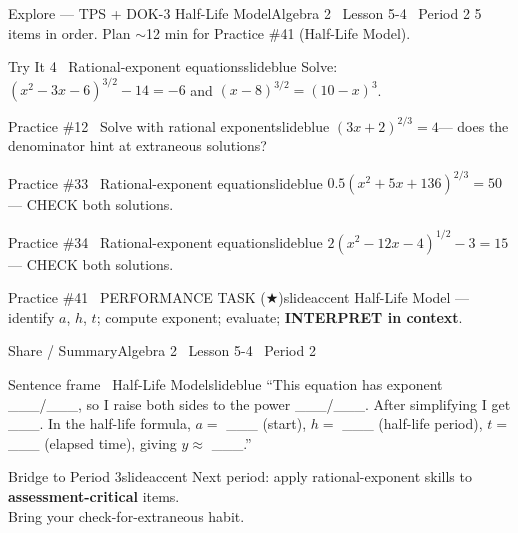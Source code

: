 \documentclass[aspectratio=169, 11pt]{beamer}
\begin{document}
\begin{frame}{Explore --- TPS + DOK-3 Half-Life Model}{Algebra 2 \textperiodcentered\ Lesson 5-4 \textperiodcentered\ Period 2}
\small\textcolor{slidegray}{5 items in order. Plan \(\sim\)12 min for Practice \#41 (Half-Life Model).}

\vspace{0.15cm}
\begin{projcard}{Try It 4 \textperiodcentered\ Rational-exponent equations}{slideblue}
Solve: \((x^2-3x-6)^{3/2} - 14 = -6\) and \((x-8)^{3/2} = (10-x)^3\).
\end{projcard}
\vspace{-0.15cm}
\begin{projcard}{Practice \#12 \textperiodcentered\ Solve with rational exponent}{slideblue}
\((3x + 2)^{2/3} = 4\)\quad --- does the denominator hint at extraneous solutions?
\end{projcard}
\vspace{-0.15cm}
\begin{projcard}{Practice \#33 \textperiodcentered\ Rational-exponent equation}{slideblue}
\(0.5(x^2+5x+136)^{2/3} = 50\)\quad --- CHECK both solutions.
\end{projcard}
\vspace{-0.15cm}
\begin{projcard}{Practice \#34 \textperiodcentered\ Rational-exponent equation}{slideblue}
\(2(x^2-12x-4)^{1/2} - 3 = 15\)\quad --- CHECK both solutions.
\end{projcard}
\vspace{-0.15cm}
\begin{projcard}{Practice \#41 \textperiodcentered\ PERFORMANCE TASK (\(\bigstar\))}{slideaccent}
Half-Life Model --- identify \(a\), \(h\), \(t\); compute exponent; evaluate; \textbf{INTERPRET in context}.
\end{projcard}
\end{frame}

\begin{frame}{Share / Summary}{Algebra 2 \textperiodcentered\ Lesson 5-4 \textperiodcentered\ Period 2}
\vspace{0.2cm}
\begin{projcard}{Sentence frame \textperiodcentered\ Half-Life Model}{slideblue}
``This equation has exponent \_\_\_/\_\_\_, so I raise both sides to the power \_\_\_/\_\_\_.
After simplifying I get \_\_\_.
In the half-life formula, \(a =\) \_\_\_ (start), \(h =\) \_\_\_ (half-life period),
\(t =\) \_\_\_ (elapsed time), giving \(y \approx\) \_\_\_.''
\end{projcard}

\vspace{0.15cm}
\begin{projcard}{Bridge to Period 3}{slideaccent}
Next period: apply rational-exponent skills to \textbf{assessment-critical} items.\\
Bring your check-for-extraneous habit.
\end{projcard}
\end{frame}
\end{document}
